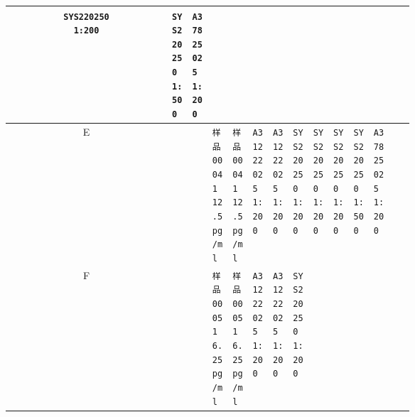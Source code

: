 \documentclass[UTF8,10pt,a4paper,fontset=fandol]{ctexart}
\newcommand{\fieldvalue}[1]{#1}
\begin{document}
\begin{center}
\begin{tabular}{c|*{12}{p{0.055\linewidth}|}}
\fieldvalue{\texttt{SYS220250\\1:200}} &
\fieldvalue{\texttt{SYS220250\\1:500}} &
\fieldvalue{\texttt{A37825025\\1:200}} &
\\ \hline
E &
&
&
\fieldvalue{\texttt{样品0004\\1\\12.5 pg/ml}} &
\fieldvalue{\texttt{样品0004\\1\\12.5 pg/ml}} &
\fieldvalue{\texttt{A31222025\\1:200}} &
\fieldvalue{\texttt{A31222025\\1:200}} &
\fieldvalue{\texttt{SYS220250\\1:200}} &
\fieldvalue{\texttt{SYS220250\\1:200}} &
\fieldvalue{\texttt{SYS220250\\1:200}} &
\fieldvalue{\texttt{SYS220250\\1:500}} &
\fieldvalue{\texttt{A37825025\\1:200}} &
\\ \hline
F &
&
&
\fieldvalue{\texttt{样品0005\\1\\6.25 pg/ml}} &
\fieldvalue{\texttt{样品0005\\1\\6.25 pg/ml}} &
\fieldvalue{\texttt{A31222025\\1:200}} &
\fieldvalue{\texttt{A31222025\\1:200}} &
\fieldvalue{\texttt{SYS220250\\1:200}} &

\end{tabular}
\end{center}
\end{document}
